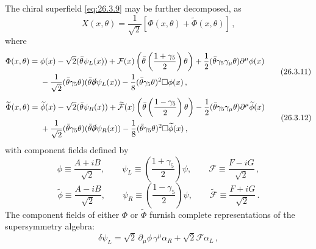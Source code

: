 The chiral superfield \eqref{eq:26.3.9} may be further decomposed, as
\begin{equation}
  X(x,\theta)=\frac{1}{\sqrt{2}}
  \left[\Phi(x,\theta)+\widetilde{\Phi}(x,\theta)\right]\,,
  \tag{26.3.10}\label{eq:26.3.10}
\end{equation}
where
\begin{equation}
  \begin{aligned}
  \Phi(x,\theta)={}&
  \phi(x)-\sqrt{2}(\bar\theta\psi_L(x))
  +\mathcal{F}(x)
    \left(\bar\theta\left(\frac{1+\gamma_5}{2}\right)\theta\right)
  +\frac12(\bar\theta\gamma_5\gamma_\mu\theta)\partial^\mu\phi(x)
  \\
  &-\frac{1}{\sqrt{2}}(\bar\theta\gamma_5\theta)
    (\bar\theta\sl{\partial}\psi_L(x))
  -\frac18(\bar\theta\gamma_5\theta)^2\Box\phi(x)\,,
  \end{aligned}
  \tag{26.3.11}\label{eq:26.3.11}
\end{equation}
\begin{equation}
  \begin{aligned}
  \widetilde{\Phi}(x,\theta)={}&
  \widetilde{\phi}(x)-\sqrt{2}(\bar\theta\psi_R(x))
  +\widetilde{\mathcal{F}}(x)
    \left(\bar\theta\left(\frac{1-\gamma_5}{2}\right)\theta\right)
  -\frac12(\bar\theta\gamma_5\gamma_\mu\theta)
    \partial^\mu\widetilde{\phi}(x)
  \\
  &+\frac{1}{\sqrt{2}}(\bar\theta\gamma_5\theta)
    (\bar\theta\sl{\partial}\psi_R(x))
  -\frac18(\bar\theta\gamma_5\theta)^2\Box\widetilde{\phi}(x)\,,
  \end{aligned}
  \tag{26.3.12}\label{eq:26.3.12}
\end{equation}
with component fields defined by
\begin{equation}
  \phi\equiv\frac{A+iB}{\sqrt{2}},\qquad
  \psi_L\equiv\left(\frac{1+\gamma_5}{2}\right)\psi,\qquad
  \mathcal{F}\equiv\frac{F-iG}{\sqrt{2}}\,,
  \tag{26.3.13}\label{eq:26.3.13}
\end{equation}
\begin{equation}
  \widetilde{\phi}\equiv\frac{A-iB}{\sqrt{2}},\qquad
  \psi_R\equiv\left(\frac{1-\gamma_5}{2}\right)\psi,\qquad
  \widetilde{\mathcal{F}}\equiv\frac{F+iG}{\sqrt{2}}\,.
  \tag{26.3.14}\label{eq:26.3.14}
\end{equation}
The component fields of either $\Phi$ or $\widetilde{\Phi}$ furnish complete
representations of the supersymmetry algebra:
\begin{equation}
  \delta\psi_L
  =\sqrt{2}\,\partial_\mu\phi\,\gamma^\mu\alpha_R
  +\sqrt{2}\mathcal{F}\alpha_L\,,
  \tag{26.3.15}\label{eq:26.3.15}
\end{equation}
